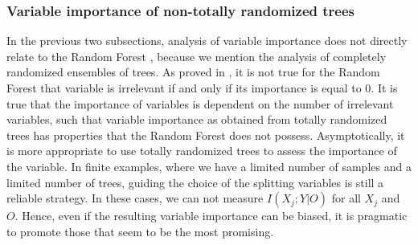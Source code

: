 \subsubsection{Variable importance of non-totally randomized trees}

In the previous two subsections, analysis of variable importance does not directly relate to the 
Random Forest \cite{breiman2001random}, because we mention the analysis of completely randomized ensembles of trees. 
As proved in \cite{kohavi1997importance}, it is not true for the Random Forest that variable is irrelevant if and only if its importance is equal to 0. 
It is true that the importance of variables is dependent on the number of irrelevant variables, 
such that variable importance as obtained from totally randomized trees has properties that the Random Forest does not possess. 
Asymptotically, it is more appropriate to use totally randomized trees to assess the importance of the variable. 
In finite examples, where we have a limited number of samples and a limited number of trees, 
guiding the choice of the splitting variables is still a reliable strategy. 
In these cases, we can not measure $I(X_j;Y|O)$ for all $X_j$ and $O$. 
Hence, even if the resulting variable importance can be biased, 
it is pragmatic to promote those that seem to be the most promising. 
